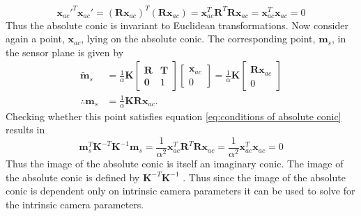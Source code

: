 \begin{equation}
	\bm{x}_{ac}'^T \bm{x}_{ac}' = \left( \bm{R} \bm{x}_{ac} \right) ^T \left( \bm{R} \bm{x}_{ac} \right) = \bm{x}_{ac}^T \bm{R}^T \bm{R} \bm{x}_{ac} = \bm{x}_{ac}^T \bm{x}_{ac} = 0
\end{equation}
Thus the absolute conic is invariant to Euclidean transformations. Now consider again a point, $\bm{x}_{ac}$, lying on the absolute conic. The corresponding point, $\bm{m}_s$, in the sensor plane is given by
\begin{align}
	\tilde{\bm{m}}_s &= \frac{1}{\alpha} \bm{K} 
	\begin{bmatrix}
	\bm{R} & \bm{T} \\
	\bm{0} & 1
	\end{bmatrix}
	\begin{bmatrix}
	\bm{x}_{ac} \\
	0
	\end{bmatrix} = \frac{1}{\alpha} \bm{K}
	\begin{bmatrix}
	\bm{R} \bm{x}_{ac} \\
	0
	\end{bmatrix} \\
	\therefore \bm{m}_s &= \frac{1}{\alpha} \bm{K} \bm{R} \bm{x}_{ac}.
\end{align}
Checking whether this point satisfies equation \ref{eq:conditions of absolute conic} results in
\begin{equation}
	\bm{m}_s^T \bm{K}^{-T} \bm{K}^{-1} \bm{m}_s = \frac{1}{\alpha^2} \bm{x}_{ac}^T \bm{R}^T \bm{R} \bm{x}_{ac} = \frac{1}{\alpha^2} \bm{x}_{ac}^T \bm{x}_{ac} = 0
\end{equation}
Thus the image of the absolute conic is itself an imaginary conic. The image of the absolute conic is defined by $\bm{K}^{-T} \bm{K}^{-1}$ \cite{luong1997self}. Thus since the image of the absolute conic is dependent only on intrinsic camera parameters it can be used to solve for the intrinsic camera parameters.

